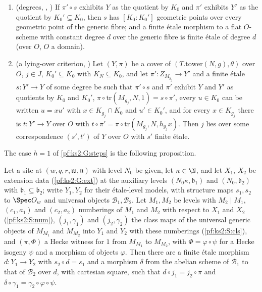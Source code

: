 \begin{enumerate}[label=(G\arabic*)]
  $\mathfrak w'\supseteq\mathfrak u$ and $h$ is a $T_i$-element at $\mathfrak w'$ with
  $\Nm\mathfrak w'^{\,i}\mid M_1$, a Hecke witness for $h$ extends as well ($T_i$ case).
\item\label{pf:ks2:G:deg} (degrees, ,
  ) If $\pi'\circ s$ exhibits
  $Y$ as the quotient by $K_0$ and $\pi'$ exhibits $Y'$ as the quotient by $K_0'\subseteq K_0$, then
  $s$ has $[K_0:K_0']$ geometric points over every geometric point of the generic fibre; and a finite
  \'etale morphism to a flat $O$-scheme with constant degree $d$ over the generic fibre is finite
  \'etale of degree $d$ (over $O$, $O$ a domain).
\item\label{pf:ks2:G:lies} (a lying-over criterion, )
  Let $(Y,\pi)$ be a cover of $(T.\mathrm{tower}(N,g),\theta)$ over $O$, $j\in J$, $K_0'\subseteq K_0$
  with $K_N\subseteq K_0$, and let $\pi'\colon Z_{M_{g_j}}\to Y'$ and a finite \'etale $s\colon Y'\to Y$
  of some degree be such that $\pi'\circ s$ and $\pi'$ exhibit $Y$ and $Y'$ as quotients by $K_0$
  and $K_0'$, $\pi\circ\mathrm{tr}(M_{g_j},N,1)=s\circ\pi'$, every $u\in K_0$ can be written $u=xu'$
  with $x\in K_{g_j}\cap K_0$ and $u'\in K_0'$, and for every $x\in K_{g_j}$ there is $t\colon Y'\to Y$
  over $O$ with $t\circ\pi'=\pi\circ\mathrm{tr}(M_{g_j},N,h_{g_j}x)$. Then $j$ lies over some
  correspondence $(s',t')$ of $Y$ over $O$ with $s'$ finite \'etale.
\end{enumerate}

The case $h=1$ of \ref{pf:ks2:G:steps} is the following proposition.

\begin{proposition}\label{pf:ks2:stepf}
Let a site at $(w,q,r,\mathfrak w,\mathfrak n)$ with level $N_0$ be given, let $\kappa\in\N$, and let
$X_1$, $X_2$ be extension data (\ref{pf:ks2:G:ext}) at the auxiliary levels $(N_0\kappa,\mathfrak
b_1)$ and $(N_0,\mathfrak b_2)$ with $\mathfrak b_1\subseteq\mathfrak b_2$; write $Y_1,Y_2$ for their
\'etale-level models, with structure maps $s_1,s_2$ to $\Spec O_w$ and universal objects $\mathcal
B_1,\mathcal B_2$. Let $M_1,M_2$ be levels with $M_2\mid M_1$, $(c_1,a_1)$ and $(c_2,a_2)$ numberings
of $M_1$ and $M_2$ with respect to $X_1$ and $X_2$ (\ref{pf:ks2:S:num}), $(j_1,\gamma_1)$ and
$(j_2,\gamma_2)$ the class maps of the universal generic objects of $M_{M_1}$ and $M_{M_2}$ into $Y_1$
and $Y_2$ with these numberings (\ref{pf:ks2:S:cls}), and $(\pi,\Phi)$ a Hecke witness for $1$ from
$M_{M_1}$ to $M_{M_2}$, with $\Phi=\varphi\circ\psi$ for a Hecke isogeny $\psi$ and a morphism of
objects $\varphi$. Then there are a finite \'etale morphism $d\colon Y_1\to Y_2$ with $s_2\circ
d=s_1$ and a morphism $\delta$ from the abelian scheme of $\mathcal B_1$ to that of $\mathcal B_2$ over
$d$, with cartesian square, such that $d\circ j_1=j_2\circ\pi$ and
$\delta\circ\gamma_1=\gamma_2\circ\varphi\circ\psi$.
\end{proposition}

